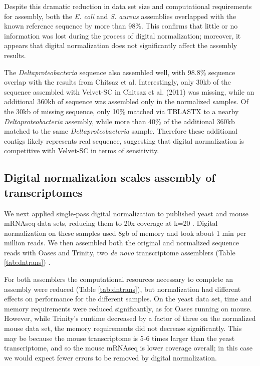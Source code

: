 \documentclass{pnastwo}
\begin{document}
\begin{article}
Despite this dramatic reduction in data set size and computational
requirements for assembly, both the {\em E. coli} and {\em S. aureus}
assemblies overlapped with the known reference sequence by more than
98\%.  This confirms that little or no information was lost during
the process of digital normalization; moreover, it appears that
digital normalization does not significantly affect the assembly results.

The {\em Deltaproteobacteria} sequence also assembled well, with
98.8\% sequence overlap with the results from Chitsaz et al.
Interestingly, only 30kb of the sequence assembled with Velvet-SC in
Chitsaz et al. (2011) was missing, while an additional 360kb of
sequence was assembled only in the normalized samples.  Of the 30kb of
missing sequence, only 10\% matched via TBLASTX to a nearby {\em
  Deltaproteobacteria} assembly, while more than 40\% of the
additional 360kb matched to the same {\em Deltaproteobacteria} sample.
Therefore these additional contigs likely represents real
sequence, suggesting that digital normalization is competitive with
Velvet-SC in terms of sensitivity.



\subsection{Digital normalization scales assembly of transcriptomes}

We next applied single-pass digital normalization to published yeast
and mouse mRNAseq data sets, reducing them to 20x coverage at k=20
\cite{pubmed21572440}.  Digital normalization on these samples used
8gb of memory and took about 1 min per million reads.  We then
assembled both the original and normalized sequence reads with Oases
and Trinity, two {\em de novo} transcriptome assemblers (Table
\ref{tab:dntrans}) \cite{pubmed22368243,pubmed21572440}.

For both assemblers the computational resources necessary to complete
an assembly were reduced (Table \ref{tab:dntrans}), but normalization
had different effects on performance for the different samples.  On the
yeast data set, time and memory requirements were reduced
significantly, as for Oases running on mouse.  However, while
Trinity's runtime decreased by a factor of three on the normalized
mouse data set, the memory requirements did not decrease
significantly.  This may be because the mouse transcriptome is 5-6
times larger than the yeast transcriptome, and so the mouse mRNAseq
is lower coverage overall; in this case we would expect fewer
errors to be removed by digital normalization.


\end{article}
\end{document}
